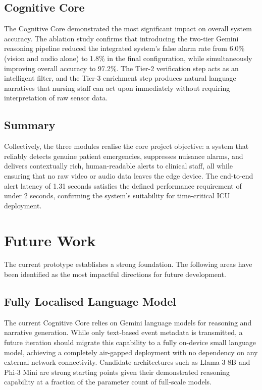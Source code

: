 \subsection{Cognitive Core}

The Cognitive Core demonstrated the most significant impact on overall system
accuracy. The ablation study confirms that introducing the two-tier Gemini
reasoning pipeline reduced the integrated system's false alarm rate from 6.0\%
(vision and audio alone) to 1.8\% in the final configuration, while simultaneously
improving overall accuracy to 97.2\%. The Tier-2 verification step acts as an
intelligent filter, and the Tier-3 enrichment step produces natural language
narratives that nursing staff can act upon immediately without requiring
interpretation of raw sensor data.

\subsection{Summary}

Collectively, the three modules realise the core project objective: a system that
reliably detects genuine patient emergencies, suppresses nuisance alarms, and
delivers contextually rich, human-readable alerts to clinical staff, all while
ensuring that no raw video or audio data leaves the edge device. The end-to-end
alert latency of 1.31 seconds satisfies the defined performance requirement of
under 2 seconds, confirming the system's suitability for time-critical ICU
deployment.

\section{Future Work}
\label{sec:future_work}

The current prototype establishes a strong foundation. The following areas have
been identified as the most impactful directions for future development.

\subsection{Fully Localised Language Model}

The current Cognitive Core relies on Gemini language models for reasoning and
narrative generation. While only text-based event metadata is transmitted, a
future iteration should migrate this capability to a fully on-device small
language model, achieving a completely air-gapped deployment with no dependency
on any external network connectivity. Candidate architectures such as Llama-3 8B
and Phi-3 Mini are strong starting points given their demonstrated reasoning
capability at a fraction of the parameter count of full-scale models.

